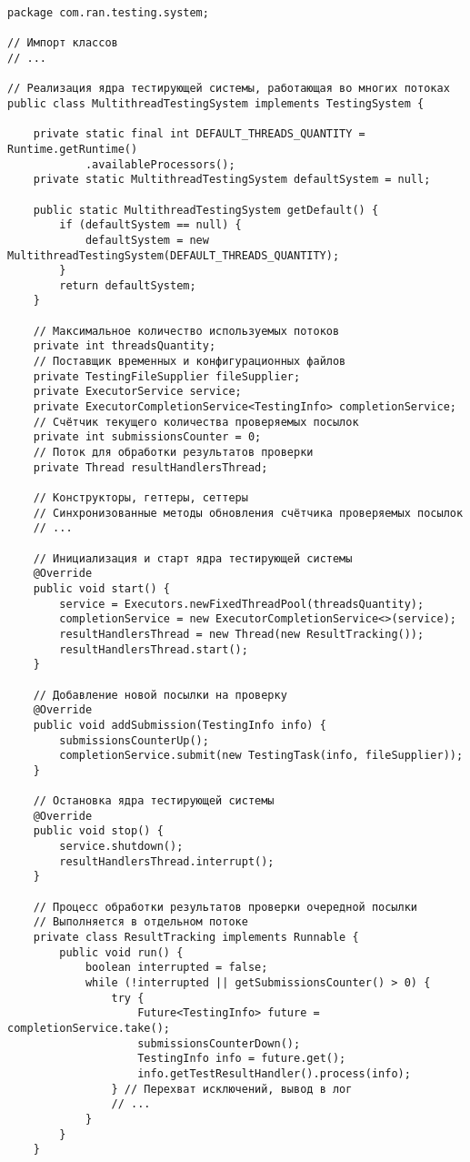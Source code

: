 \begin{verbatim}
package com.ran.testing.system;

// Импорт классов
// ...

// Реализация ядра тестирующей системы, работающая во многих потоках
public class MultithreadTestingSystem implements TestingSystem {

    private static final int DEFAULT_THREADS_QUANTITY = Runtime.getRuntime()
            .availableProcessors();
    private static MultithreadTestingSystem defaultSystem = null;
    
    public static MultithreadTestingSystem getDefault() {
        if (defaultSystem == null) {
            defaultSystem = new MultithreadTestingSystem(DEFAULT_THREADS_QUANTITY);
        }
        return defaultSystem;
    }
    
    // Максимальное количество используемых потоков
    private int threadsQuantity;
    // Поставщик временных и конфигурационных файлов
    private TestingFileSupplier fileSupplier;
    private ExecutorService service;
    private ExecutorCompletionService<TestingInfo> completionService;
    // Счётчик текущего количества проверяемых посылок
    private int submissionsCounter = 0;
    // Поток для обработки результатов проверки
    private Thread resultHandlersThread;

    // Конструкторы, геттеры, сеттеры
    // Синхронизованные методы обновления счётчика проверяемых посылок
    // ...
    
    // Инициализация и старт ядра тестирующей системы
    @Override
    public void start() {
        service = Executors.newFixedThreadPool(threadsQuantity);
        completionService = new ExecutorCompletionService<>(service);
        resultHandlersThread = new Thread(new ResultTracking());
        resultHandlersThread.start();
    }

    // Добавление новой посылки на проверку
    @Override
    public void addSubmission(TestingInfo info) {
        submissionsCounterUp();
        completionService.submit(new TestingTask(info, fileSupplier));
    }

    // Остановка ядра тестирующей системы
    @Override
    public void stop() {
        service.shutdown();
        resultHandlersThread.interrupt();
    }
    
    // Процесс обработки результатов проверки очередной посылки
    // Выполняется в отдельном потоке
    private class ResultTracking implements Runnable {
        public void run() {
            boolean interrupted = false;
            while (!interrupted || getSubmissionsCounter() > 0) {
                try {
                    Future<TestingInfo> future = completionService.take();
                    submissionsCounterDown();
                    TestingInfo info = future.get();
                    info.getTestResultHandler().process(info);
                } // Перехват исключений, вывод в лог
                // ...
            }
        }
    }
    

\end{verbatim}
